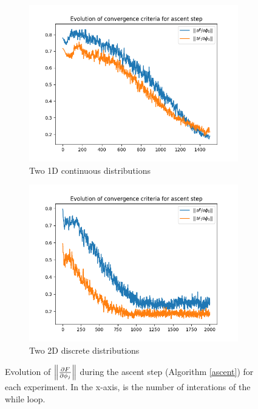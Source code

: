  \begin{figure}
    \begin{subfigure}{.5\textwidth}
        \centering
        \includegraphics[width=\textwidth]{figures/ascent_criteria_msamples16000_iter0_1D_2skewnorm.png}
        \caption{Two 1D continuous distributions}
    \end{subfigure}
    \begin{subfigure}{.5\textwidth}
        \centering
        \includegraphics[width=\textwidth]{figures/ascent_criteria_msamples16000_iter0_2D_discrete.png}
        \caption{Two 2D discrete distributions }
    \end{subfigure}
    \caption{Evolution of $\left\lVert \frac{\partial F}{\partial \phi_j} \right\rVert$ during the ascent step (Algorithm \ref{ascent}) for each experiment. In the x-axis, is the number of interations of the while loop.}
    \label{fig:ascent_criteria}
\end{figure}


